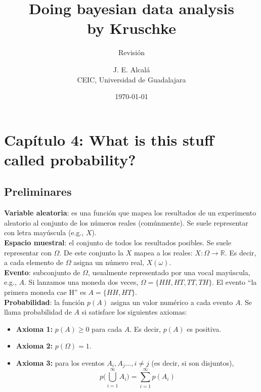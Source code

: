 \documentclass{scrartcl}
\title{\color{tit} Doing bayesian data analysis\\
		by Kruschke}
\subtitle{Revisión}
\author{\normalsize J. E. Alcalá \\
		\normalsize CEIC, Universidad de Guadalajara}
\date{\today}
\begin{document}
\maketitle 
	\section{Capítulo 4: What is this stuff called probability?}
	\subsection{Preliminares}
	
	\begin{tcolorbox}[title=Definiciones]
		\textbf{Variable aleatoria}: es una función que mapea los resultados de un experimento aleatorio al conjunto de los números reales (comúnmente). Se suele representar con letra mayúscula (e.g., $X$).\\
		\textbf{Espacio muestral}: el conjunto de todos los resultados posibles. Se suele representar con $\Omega$. De este conjunto la $X$ mapea a los reales: $X: \Omega \rightarrow \mathbb{R}$. Es decir, a cada elemento de $\Omega$ asigna un número real, $X(\omega)$.\\
		\textbf{Evento}: subconjunto de $\Omega$, usualmente representado por una vocal mayúscula, e.g., $A$. Si lanzamos una moneda dos veces, $\Omega = \{HH,HT,TT,TH\}$. El evento ``la primera moneda cae H'' es $A=\{HH,HT\}$. \\
		\textbf{Probabilidad}: la función $p(A)$ asigna un valor numérico a cada evento $A$. Se llama probabilidad de $A$ si satisface los siguientes axiomas:
		\begin{itemize}
			\item \textbf{Axioma 1:} $p(A) \geq 0$ para cada $A$. Es decir, $p(A)$ es positiva.
			\item \textbf{Axioma 2:} $p(\Omega) = 1$.
			\item \textbf{Axioma 3:} para los eventos $A_i,A_j..., i \neq j$ (es decir, si son disjuntos), 
			\[p\Bigg (\bigcup^\infty_{i=1} A_i \Bigg) = \sum_{i=1}^{\infty} p(A_i)\]
		\end{itemize}
		
	\end{tcolorbox}
\end{document}
